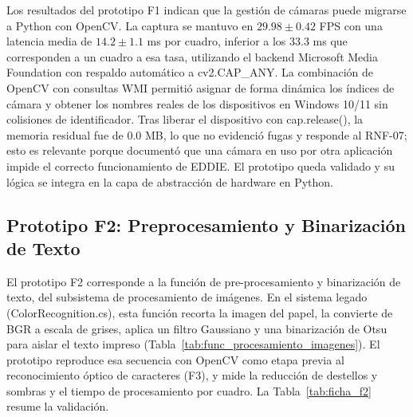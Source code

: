 Los resultados del prototipo F1 indican que la gestión de cámaras puede migrarse a Python con OpenCV. La captura se mantuvo en $29.98 \pm 0.42$ FPS con una latencia media de $14.2 \pm 1.1$ ms por cuadro, inferior a los 33.3 ms que corresponden a un cuadro a esa tasa, utilizando el backend Microsoft Media Foundation con respaldo automático a cv2.CAP\_ANY. La combinación de OpenCV con consultas WMI permitió asignar de forma dinámica los índices de cámara y obtener los nombres reales de los dispositivos en Windows 10/11 sin colisiones de identificador. Tras liberar el dispositivo con cap.release(), la memoria residual fue de 0.0 MB, lo que no evidenció fugas y responde al RNF-07; esto es relevante porque \cite{ibaceta2023evaluacion} documentó que una cámara en uso por otra aplicación impide el correcto funcionamiento de EDDIE. El prototipo queda validado y su lógica se integra en la capa de abstracción de hardware en Python.

\subsection{Prototipo F2: Preprocesamiento y Binarización de Texto}
 
El prototipo F2 corresponde a la función de pre-procesamiento y binarización de texto, del subsistema de procesamiento de imágenes. En el sistema legado (ColorRecognition.cs), esta función recorta la imagen del papel, la convierte de BGR a escala de grises, aplica un filtro Gaussiano y una binarización de Otsu para aislar el texto impreso (Tabla~\ref{tab:func_procesamiento_imagenes}). El prototipo reproduce esa secuencia con OpenCV como etapa previa al reconocimiento óptico de caracteres (F3), y mide la reducción de destellos y sombras y el tiempo de procesamiento por cuadro. La Tabla~\ref{tab:ficha_f2} resume la validación.
 
